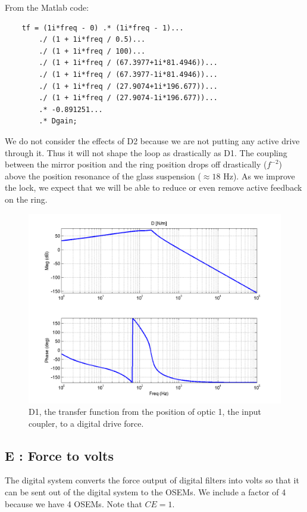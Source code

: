 From the Matlab code:

\begin{verbatim}
    tf = (1i*freq - 0) .* (1i*freq - 1)...
        ./ (1 + 1i*freq / 0.5)...
        ./ (1 + 1i*freq / 100)...
        ./ (1 + 1i*freq / (67.3977+1i*81.4946))...
        ./ (1 + 1i*freq / (67.3977-1i*81.4946))...
        ./ (1 + 1i*freq / (27.9074+1i*196.677))...
        ./ (1 + 1i*freq / (27.9074-1i*196.677))...
        .* -0.891251...
        .* Dgain;
\end{verbatim}


We do not consider the effects of D2 because we are not putting any active drive through it. Thus it will not shape the loop as drastically as D1. The coupling between the mirror position and the ring position drops off drastically ($f^{-2}$) above the position resonance of the glass suspension ($\approx 18\mbox{ Hz}$). As we improve the lock, we expect that we will be able to reduce or even remove active feedback on the ring.

\begin{figure}[htbp]
\includegraphics[width=\columnwidth]{figures/controls/D.png}%
\caption[D1 transfer function]{D1, the transfer function from the position of optic 1, the input coupler, to a digital drive force. }%
\label{fig:D}%
\end{figure}

\subsection{E : Force to volts}

The digital system converts the force output of digital filters into volts so that it can be sent out of the digital system to the OSEMs. We include a factor of 4 because we have 4 OSEMs.  Note that $CE = 1$.


